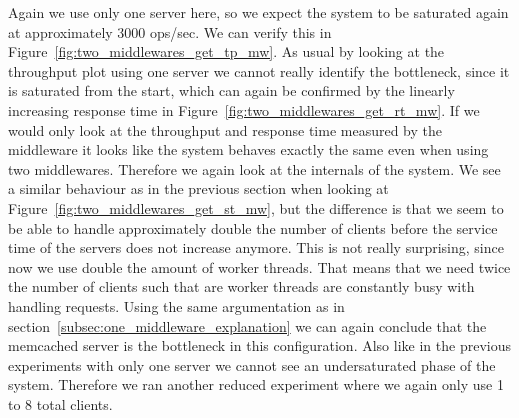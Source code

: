 \documentclass[11pt,a4paper]{article}
\begin{document}
Again we use only one server here, so we expect the system to be saturated again at approximately 3000 ops/sec.
%
We can verify this in Figure~\ref{fig:two_middlewares_get_tp_mw}.
%
As usual by looking at the throughput plot using one server we cannot really identify the bottleneck, since it is saturated from the start, which can again be confirmed by the linearly increasing response time in Figure~\ref{fig:two_middlewares_get_rt_mw}.
%
If we would only look at the throughput and response time measured by the middleware it looks like the system behaves exactly the same even when using two middlewares.
%
Therefore we again look at the internals of the system.
%
We see a similar behaviour as in the previous section when looking at Figure~\ref{fig:two_middlewares_get_st_mw}, but the difference is that we seem to be able to handle approximately double the number of clients before the service time of the servers does not increase anymore.
%
This is not really surprising, since now we use double the amount of worker threads.
%
That means that we need twice the number of clients such that are worker threads are constantly busy with handling requests.
%
Using the same argumentation as in section~\ref{subsec:one_middleware_explanation} we can again conclude that the memcached server is the bottleneck in this configuration.
%
Also like in the previous experiments with only one server we cannot see an undersaturated phase of the system.
%
Therefore we ran another reduced experiment where we again only use 1 to 8 total clients.
%
\end{document}
